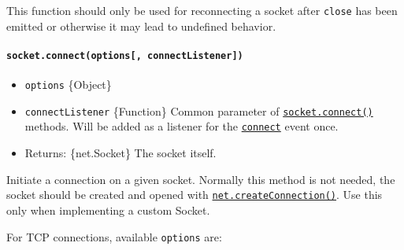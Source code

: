 This function should only be used for reconnecting a socket after
\texttt{\textquotesingle{}close\textquotesingle{}} has been emitted or
otherwise it may lead to undefined behavior.

\paragraph{\texorpdfstring{\texttt{socket.connect(options{[},\ connectListener{]})}}{socket.connect(options{[}, connectListener{]})}}\label{socket.connectoptions-connectlistener}

\begin{itemize}
\tightlist
\item
  \texttt{options} \{Object\}
\item
  \texttt{connectListener} \{Function\} Common parameter of
  \hyperref[socketconnect]{\texttt{socket.connect()}} methods. Will be
  added as a listener for the
  \hyperref[event-connect]{\texttt{\textquotesingle{}connect\textquotesingle{}}}
  event once.
\item
  Returns: \{net.Socket\} The socket itself.
\end{itemize}

Initiate a connection on a given socket. Normally this method is not
needed, the socket should be created and opened with
\hyperref[netcreateconnection]{\texttt{net.createConnection()}}. Use
this only when implementing a custom Socket.

For TCP connections, available \texttt{options} are:

